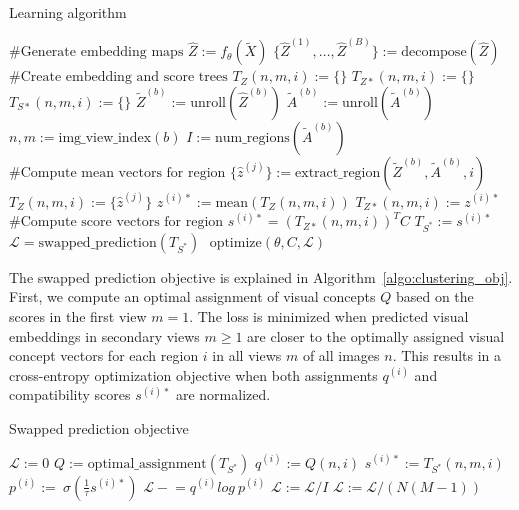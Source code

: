 \documentclass{bmvc2k}
\begin{document}
\begin{algorithm}
\caption{Learning algorithm}
\label{algo:learning_algo}
\begin{algorithmic}
\State $\text{\# Generate embedding maps}$
\State $\hat{Z} := f_{\theta}(\tilde{X})$ 
\State $\{\hat{Z}^{(1)}, \dots, \hat{Z}^{(B)}\} := \text{decompose}(\hat{Z})$
\State $ $
\State $\text{\# Create embedding and score trees}$
\State $T_Z(n,m,i) := \{\}$ 
\State $T_{Z*}(n,m,i) := \{\}$
\State $T_{S*}(n,m,i) := \{\}$
    \State $\tilde{Z}^{(b)} := \text{unroll}(\hat{Z}^{(b)})$ 
\State $\tilde{A}^{(b)} := \text{unroll}(\tilde{A}^{(b)})$ 
    \State $n, m := \text{img\_view\_index}(b)$
    \State $I := \text{num\_regions}(\tilde{A}^{(b)})$
        \State $\text{\# Compute mean vectors for region}$
        \State $\{\hat{z}^{(j)}\} := \text{extract\_region}(\tilde{Z}^{(b)}, \tilde{A}^{(b)}, i)$
        \State $T_Z(n,m,i) := \{\hat{z}^{(j)}\}$
        \State $z^{(i)*} := \text{mean}(T_Z(n,m,i))$
        \State $T_{Z*}(n,m,i) := z^{(i)*}$
        \State $ $
        \State $\text{\# Compute score vectors for region}$
        \State $s^{(i)*} = (T_{Z*}(n,m,i))^T C $
        \State $T_{S^*} := s^{(i)*}$
    \EndFor
\EndFor
\State $ $
\State $\mathcal{L} = \text{swapped\_prediction}(T_{S^*})$
\State $ $
\State $\text{optimize}({\theta, C, \mathcal{L}})$
\end{algorithmic}
\end{algorithm}

The swapped prediction objective is explained in Algorithm~\ref{algo:clustering_obj}. First, we compute an optimal assignment of visual concepts $Q$ based on the scores in the first view $m = 1$. The loss is minimized when predicted visual embeddings in secondary views $m \ge 1$ are closer to the optimally assigned visual concept vectors for each region $i$ in all views $m$ of all images $n$. This results in a cross-entropy optimization objective when both assignments $q^{(i)}$ and compatibility scores $s^{(i)*}$ are normalized.

\begin{algorithm}
\caption{Swapped prediction objective}
\label{algo:clustering_obj}
\begin{algorithmic}
\State $\mathcal{L} := 0$
\State $Q := \text{optimal\_assignment}(T_{S^*})$
            \State $q^{(i)} := Q(n,i)$
            \State $s^{(i)*} := T_{S^*}(n,m,i)$
            \State $p^{(i)} := \: \sigma \left( \tfrac{1}{\tau} s^{(i)*} \right)$
            \State $\mathcal{L} \mathrel{-}= q^{(i)} log \: p^{(i)}$
        \EndFor
        \State $\mathcal{L} := \mathcal{L} / I$
    \EndFor
\EndFor
\State $\mathcal{L} := \mathcal{L} / (N (M-1))$
\end{algorithmic}
\end{algorithm}
\end{document}

